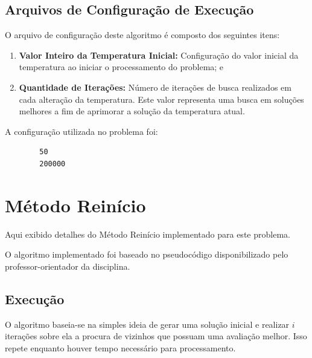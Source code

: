 \documentclass[portugues, brazil, a4paper,12pt]{article}
\begin{document}
	\subsection{Arquivos de Configuração de Execução}
		O arquivo de configuração deste algoritmo é composto dos seguintes itens:
		
		\begin{enumerate}
			\item \textbf{Valor Inteiro da Temperatura Inicial:} Configuração do valor inicial da temperatura ao iniciar o processamento do problema; e
			
			\item \textbf{Quantidade de Iterações:} Número de iterações de busca realizados em cada alteração da temperatura. Este valor representa uma busca em soluções melhores a fim de aprimorar a solução da temperatura atual.
		\end{enumerate}
		
		A configuração utilizada no problema foi:
		
		\begin{verbatim}
		50
		200000
		\end{verbatim}
	



\section{Método Reinício}
	Aqui exibido detalhes do Método Reinício implementado para este problema.
	
	O algoritmo implementado foi baseado no pseudocódigo disponibilizado pelo professor-orientador da disciplina.
	
	\subsection{Execução}
		O algoritmo baseia-se na simples ideia de gerar uma solução inicial e realizar $i$ iterações sobre ela a procura de vizinhos que possuam uma avaliação melhor. Isso repete enquanto houver tempo necessário para processamento.
	
\end{document}
